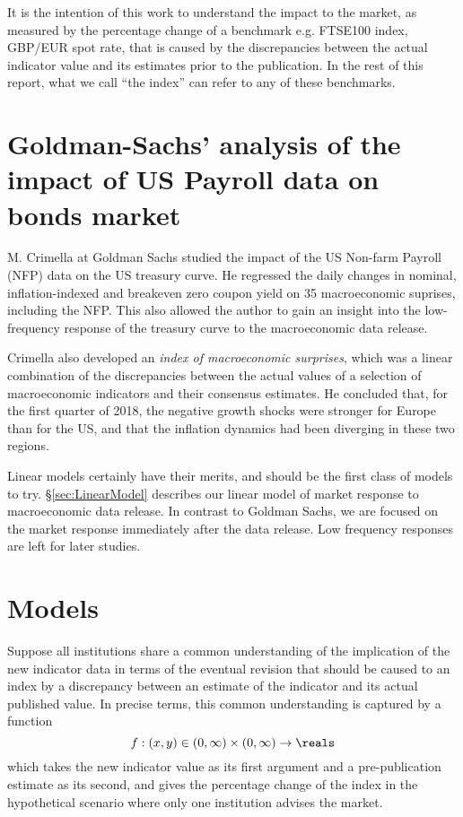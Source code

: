 \documentclass[a4paper,11pt,pdftex,twoside,titlepage]{article}
\begin{document}
It is the intention of this work to understand the impact to the market,
as measured by the percentage change of a benchmark e.g. FTSE100 index,
GBP/EUR spot rate, that is caused by the discrepancies between the
actual indicator value and its estimates prior to the publication. In
the rest of this report, what we call ``the index'' can refer to any
of these benchmarks.

\section{Goldman-Sachs' analysis of the impact of US Payroll data on
  bonds market}
M. Crimella at Goldman Sachs studied the impact of the US Non-farm
Payroll (NFP) data on the US treasury curve. He regressed the daily
changes in nominal, inflation-indexed and breakeven zero coupon yield
on 35 macroeconomic suprises, including the NFP. This also allowed the
author to gain an insight into the low-frequency response of the
treasury curve to the macroeconomic data release.

Crimella also developed an {\it index of macroeconomic surprises},
which was a linear combination of the discrepancies between the actual
values of a selection of macroeconomic indicators and their consensus
estimates. He concluded that, for the first quarter of 2018, the
negative growth shocks were stronger for Europe than for the US, and
that the inflation dynamics had been diverging in these two regions.

Linear models certainly have their merits, and should be the first
class of models to try. \S\ref{sec:LinearModel} describes our linear
model of market response to macroeconomic data release. In contrast to
Goldman Sachs, we are focused on the market response immediately after
the data release. Low frequency responses are left for later studies.

\section{Models}
Suppose all institutions share a common understanding of the
implication of the new indicator data in terms of the eventual revision
that should be caused to an index by a discrepancy between an
estimate of the indicator and its actual published value. In precise
terms, this common understanding is captured by a function
\[
  f: (x, y) \in (0, \infty) \times (0, \infty) \to \reals
\]
which takes the new indicator value as its first argument and a
pre-publication estimate as its second, and gives the
percentage change of the index in the hypothetical scenario
where only one institution advises the market.
\end{document}

